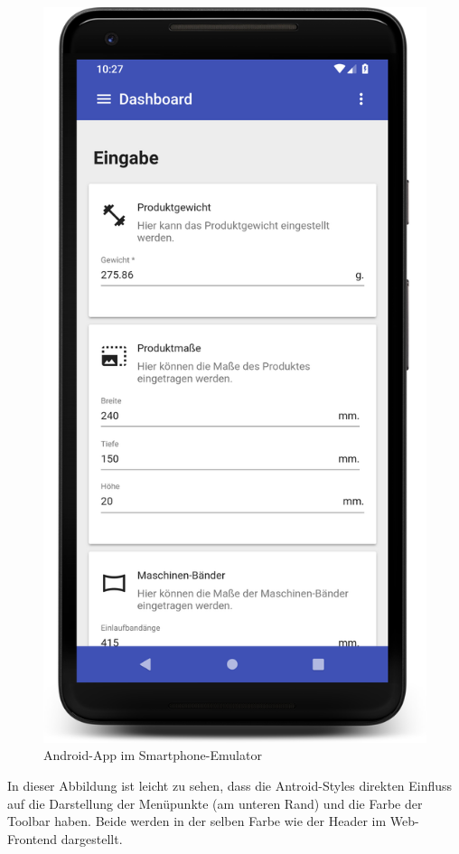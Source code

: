 \begin{figure}[h]
    \centering
    \includegraphics[scale=0.095]{images/kapitel_4/android_app.png}
    \caption{Android-App im Smartphone-Emulator}
    \label{fig:umsetzung_android_app}
\end{figure}

In dieser Abbildung ist leicht zu sehen, dass die Antroid-Styles direkten Einfluss auf die Darstellung der Menüpunkte
(am unteren Rand) und die Farbe der Toolbar haben. Beide werden in der selben Farbe wie der Header im Web-Frontend
dargestellt.

